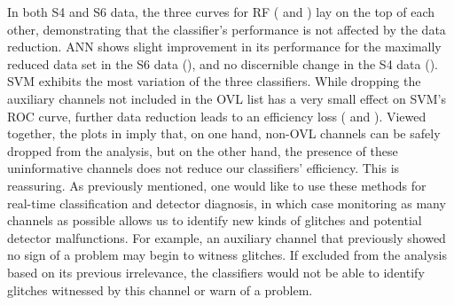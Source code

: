 \documentclass[prd, twocolumn, lengthcheck, superscriptaddress, showpacs, letterpaper, nofootinbib]{revtex4-1}
\begin{document}
%        

In both S4 and S6 data, the three curves for \ac{RF} ( and ) lay on the top of each other, demonstrating that the classifier's performance is not affected by the data reduction. \ac{ANN} shows slight improvement in its performance for the maximally reduced data set in the S6 data (), and no discernible change in the S4 data (). \ac{SVM} exhibits the most variation of the three classifiers. While dropping the auxiliary channels not included in the \ac{OVL} list has a very small effect on \ac{SVM}'s ROC curve, further data reduction leads to an efficiency loss ( and ). Viewed together, the plots in  imply that, on one hand, non-\ac{OVL} channels can be safely dropped from the analysis, but on the other hand, the presence of these uninformative channels does not reduce our classifiers' efficiency. This is reassuring. As previously mentioned, one would like to use these methods for real-time classification and detector diagnosis, in which case monitoring as many channels as possible allows us to identify new kinds of glitches and potential detector malfunctions. For example, an auxiliary channel that previously showed no sign of a problem may begin to witness glitches. If excluded from the analysis based on its previous irrelevance, the classifiers would not be able to identify glitches witnessed by this channel or warn of a problem.
\end{document}
